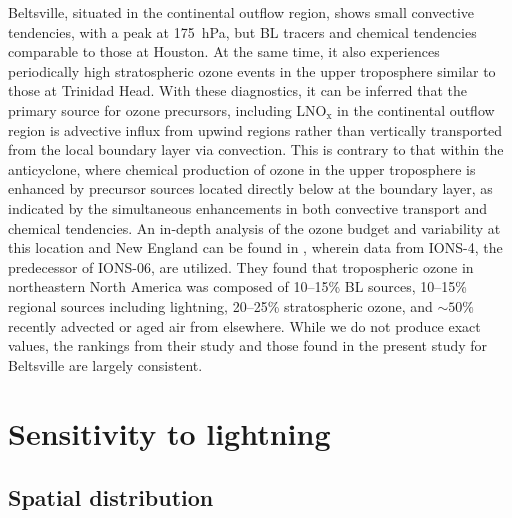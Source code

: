 Beltsville, situated in the continental outflow region, shows small convective
tendencies, with a peak at 175~hPa, but BL tracers and chemical tendencies comparable to those at Houston.
At the same time, it also experiences periodically high stratospheric ozone events
in the upper troposphere similar to those at Trinidad Head. With these diagnostics,
it can be inferred that the primary source for ozone precursors, including
LNO$_{\mathrm{x}}$ in the continental outflow region is advective influx from
upwind regions rather than vertically transported from the local boundary layer
via convection. This is contrary to that within the anticyclone, where chemical
production of ozone in the upper troposphere is enhanced by precursor sources
located directly below at the boundary layer, as indicated by the simultaneous
enhancements in both convective transport and chemical tendencies. An in-depth analysis of the ozone
budget and variability at this location and New England can be found in
\citet{Thompson:2007gd,Thompson:2007ov}, wherein data from IONS-4, the
predecessor of IONS-06, are utilized. They found that tropospheric ozone in
northeastern North America was composed of 10--15\% BL sources, 10--15\%
regional sources including lightning, 20--25\% stratospheric ozone, and
$\sim50\%$ recently advected or aged air from elsewhere. While we
do not produce exact values, the rankings from their study and those found in
the present study for Beltsville are largely consistent.

\section{Sensitivity to lightning}\label{sect:sensitivity}

\subsection{Spatial distribution}

